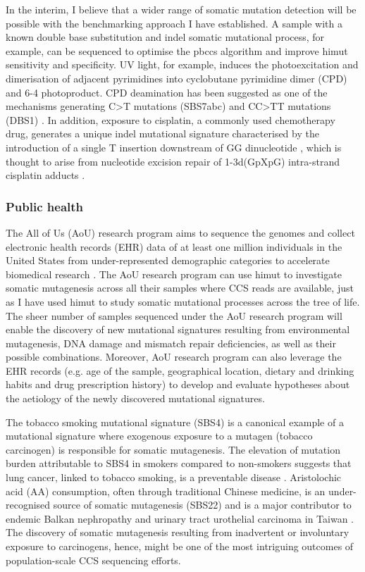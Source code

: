 In the interim, I believe that a wider range of somatic mutation detection will be possible with the benchmarking approach I have established. A sample with a known double base substitution and indel somatic mutational process, for example, can be sequenced to optimise the pbccs algorithm and improve himut sensitivity and specificity. UV light, for example, induces the photoexcitation and dimerisation of adjacent pyrimidines into cyclobutane pyrimidine dimer (CPD) and 6-4 photoproduct. CPD deamination has been suggested as one of the mechanisms generating C>T mutations (SBS7abc) and CC>TT mutations (DBS1) \cite{Jin2021-ae}. In addition, exposure to cisplatin, a commonly used chemotherapy drug, generates a unique indel mutational signature characterised by the introduction of a single T insertion downstream of GG dinucleotide \cite{Szikriszt2016-ed}, which is thought to arise from nucleotide excision repair of 1-3d(GpXpG) intra-strand cisplatin adducts \cite{Zamble1996-mx}. 

\subsubsection{Public health}

The All of Us (AoU) research program aims to sequence the genomes and collect electronic health records (EHR) data of at least one million individuals in the United States from under-represented demographic categories to accelerate biomedical research \cite{AoU2019}. The AoU research program can use himut to investigate somatic mutagenesis across all their samples where CCS reads are available, just as I have used himut to study somatic mutational processes across the tree of life. The sheer number of samples sequenced under the AoU research program will enable the discovery of new mutational signatures resulting from environmental mutagenesis, DNA damage and mismatch repair deficiencies, as well as their possible combinations. Moreover, AoU research program can also leverage the EHR records (e.g. age of the sample, geographical location, dietary and drinking habits and drug prescription history) to develop and evaluate hypotheses about the aetiology of the newly discovered mutational signatures.

The tobacco smoking mutational signature (SBS4) is a canonical example of a mutational signature where exogenous exposure to a mutagen (tobacco carcinogen) is responsible for somatic mutagenesis. The elevation of mutation burden attributable to SBS4 in smokers compared to non-smokers suggests that lung cancer, linked to tobacco smoking, is a preventable disease \cite{Alexandrov2016-uw}. Aristolochic acid (AA) consumption, often through traditional Chinese medicine, is an under-recognised source of somatic mutagenesis (SBS22) and is a major contributor to endemic Balkan nephropathy \cite{} and urinary tract urothelial carcinoma in Taiwan \cite{}. The discovery of somatic mutagenesis resulting from inadvertent or involuntary exposure to carcinogens, hence, might be one of the most intriguing outcomes of population-scale CCS sequencing efforts. 


